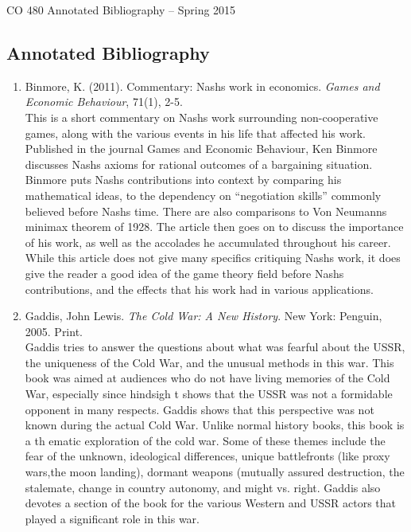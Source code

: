 \documentclass[11pt]{article}
\begin{document}
\begin{center}
{\Large CO 480 Annotated Bibliography -- Spring 2015} 
\end{center}

\subsection*{Annotated Bibliography}

\begin{enumerate}

\item Binmore, K. (2011). Commentary: Nash\textsc{}s work in economics. \textit{Games and Economic Behaviour}, 71(1), 2-5.\\

This is a short commentary on Nash\textsc{}s work surrounding non-cooperative games, along with the various events in his life that affected his work. Published in the journal Games and Economic Behaviour, Ken Binmore discusses Nash\textsc{}s axioms for rational outcomes of a bargaining situation. Binmore puts Nash\textsc{}s contributions into context by comparing his mathematical ideas, to the dependency on “negotiation skills” commonly believed before Nash\textsc{}s time. There are also comparisons to Von Neumann\textsc{}s minimax theorem of 1928. The article then goes on to discuss the importance of his work, as well as the accolades he accumulated throughout his career. While this article does not give many specifics critiquing Nash\textsc{}s work, it does give the reader a good idea of the game theory field before Nash\textsc{}s contributions, and the effects that his work had in various applications.\\

\item Gaddis, John Lewis.  \textit{The Cold War: A New History}. New York: Penguin, 2005. Print.\\
 
Gaddis tries to answer the questions about what was fearful about the USSR, the uniqueness of the Cold War, and the unusual methods in this war. This book was aimed at audiences who do not have living memories of the Cold War, especially since hindsigh
t shows that the USSR was not a formidable opponent in many respects. Gaddis shows that this perspective was not known during the actual Cold War. Unlike normal history books, this book is a th
ematic exploration of the cold war. Some of these themes include the fear of the unknown, ideological differences, unique battlefronts (like proxy wars,the moon landing), dormant weapons (mutually assured destruction, the stalemate, change in country 
autonomy, and might vs. right. Gaddis also devotes a section of the book for the various Western and USSR actors that played a significant role in this war.\\


\end{enumerate}
\end{document}
